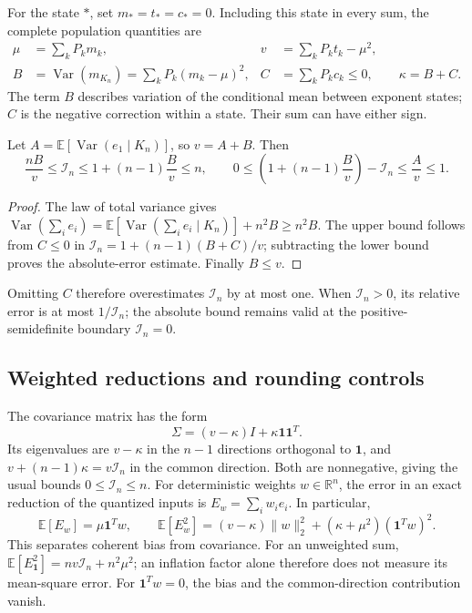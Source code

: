 For the state $*$, set $m_*=t_*=c_*=0$. Including this state in every sum,
the complete population quantities are
\begin{align}
 \mu&=\sum_k P_km_k,&
 v&=\sum_kP_kt_k-\mu^2,\label{eq:revision-global}\\
 B&=\operatorname{Var}(m_{K_n})
      =\sum_kP_k(m_k-\mu)^2,&
 C&=\sum_kP_kc_k\le0,\qquad \kappa=B+C.
 \label{eq:revision-decomposition}
\end{align}
The term $B$ describes variation of the conditional mean between exponent
states; $C$ is the negative correction within a state. Their sum can have
either sign.

\begin{corollary}
\label{cor:revision-bracket}
Let $A=\mathbb E[\operatorname{Var}(e_1\mid K_n)]$, so $v=A+B$. Then
\begin{equation}\label{eq:revision-bracket}
 \frac{nB}{v}\le\mathcal I_n
       \le1+(n-1)\frac{B}{v}\le n,
 \qquad
 0\le \left(1+(n-1)\frac{B}{v}\right)-\mathcal I_n\le\frac{A}{v}\le1.
\end{equation}
\end{corollary}

\begin{proof}
The law of total variance gives
$\operatorname{Var}(\sum_i e_i)
=\mathbb E[\operatorname{Var}(\sum_i e_i\mid K_n)]+n^2 B\ge n^2B$.
The upper bound follows from $C\le0$ in
$\mathcal I_n=1+(n-1)(B+C)/v$; subtracting the lower bound proves the
absolute-error estimate. Finally $B\le v$.
\end{proof}

Omitting $C$ therefore overestimates $\mathcal I_n$ by at most one. When
$\mathcal I_n>0$, its relative error is at most $1/\mathcal I_n$; the
absolute bound remains valid at the positive-semidefinite boundary
$\mathcal I_n=0$.

\subsection{Weighted reductions and rounding controls}

The covariance matrix has the form
\begin{equation}\label{eq:revision-spectrum}
 \Sigma=(v-\kappa)I+\kappa\mathbf 1\mathbf 1^T.
\end{equation}
Its eigenvalues are $v-\kappa$ in the $n-1$ directions orthogonal to
$\mathbf1$, and $v+(n-1)\kappa=v\mathcal I_n$ in the common direction.
Both are nonnegative, giving the usual bounds $0\le\mathcal I_n\le n$.
For deterministic weights $w\in\mathbb R^n$, the error in an exact reduction
of the quantized inputs is $E_w=\sum_iw_ie_i$. In particular,
\begin{equation}\label{eq:revision-weighted}
 \mathbb E[E_w]=\mu\mathbf1^Tw,\qquad
 \mathbb E[E_w^2]=(v-\kappa)\|w\|_2^2
                  +(\kappa+\mu^2)(\mathbf1^Tw)^2.
\end{equation}
This separates coherent bias from covariance. For an unweighted sum,
$\mathbb E[E_{\mathbf1}^2]=nv\mathcal I_n+n^2\mu^2$; an inflation factor
alone therefore does not measure its mean-square error. For $\mathbf1^Tw=0$,
the bias and the common-direction contribution vanish.


